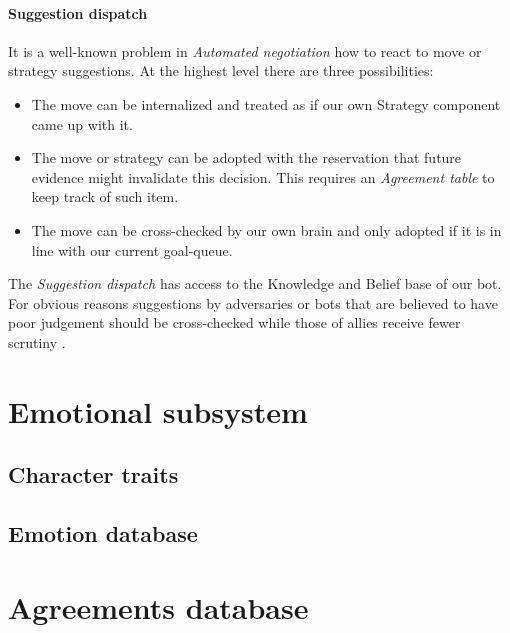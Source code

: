 \documentclass[pdftex,12pt,a4paper]{report}
\begin{document}
\paragraph{Suggestion dispatch}
It is a well-known problem in \textit{Automated negotiation} how 
to react to move or strategy suggestions. At the highest level there
are three possibilities:

\begin{itemize}

\item The move can be internalized and treated as if our own 
      Strategy component came up with it. 

\item The move or strategy can be adopted with the reservation 
      that future evidence might invalidate this decision. This 
      requires an \textit{Agreement table} to keep track of such
      item.

\item The move can be cross-checked by our own brain and only 
      adopted if it is in line with our current goal-queue. 

\end{itemize}

The \textit{Suggestion dispatch} has access to the Knowledge and
Belief base of our bot. For obvious reasons suggestions by
adversaries or bots that are believed to have poor judgement 
should be cross-checked while those of allies receive fewer
scrutiny . \\

\section{Emotional subsystem}



\subsection{Character traits}

\subsection{Emotion database}


\section{Agreements database}

\end{document}

